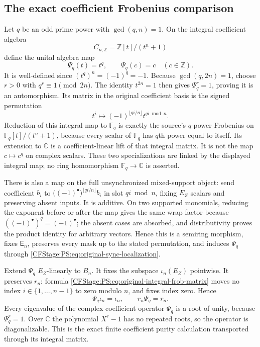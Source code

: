 \subsection{The exact coefficient Frobenius comparison}

Let $q$ be an odd prime power with $\gcd(q,n)=1$.
On the integral coefficient algebra
\[
 C_{n,\mathbb Z}=\mathbb Z[t]/(t^n+1)
\]
define the unital algebra map
\[
 \Psi_q(t)=t^q,\qquad \Psi_q(c)=c\quad(c\in\mathbb Z).
\]
It is well-defined since $(t^q)^n=(-1)^q=-1$.
Because $\gcd(q,2n)=1$, choose $r>0$ with $q^r\equiv1\pmod{2n}$.
The identity $t^{2n}=1$ then gives $\Psi_q^r=1$, proving it is an
automorphism. Its matrix in the original coefficient basis is the
signed permutation
\begin{equation}
 t^i\longmapsto(-1)^{\lfloor qi/n\rfloor}t^{qi\bmod n}.
 \label{CFStage:PS:eq:original-integral-frob-matrix}
\end{equation}
Reduction of this integral map to $\mathbb F_q$ is exactly the
source's $q$-power Frobenius on $\mathbb F_q[t]/(t^n+1)$, because
every scalar of $\mathbb F_q$ has $q$th power equal to itself.
Its extension to $\mathbb C$ is a coefficient-linear lift of that
integral matrix. It is not the map $c\mapsto c^q$ on complex scalars.
These two specializations are linked by the displayed integral map;
no ring homomorphism $\mathbb F_q\to\mathbb C$ is asserted.

There is also a map on the full unsynchronized mixed-support object:
send coefficient $b_i$ to
$\bigl((-1)^\bullet\bigr)^{\lfloor qi/n\rfloor}b_i$ in slot $qi\bmod n$,
fixing $E_Z$ scalars and preserving absent inputs. It is additive.
On two supported monomials, reducing the exponent before or after
the map gives the same wrap factor because $((-1)^\bullet)^q=(-1)^\bullet$;
the absent cases are absorbed, and distributivity proves the product
identity for arbitrary vectors. Hence this is a semiring morphism,
fixes $\mathsf E_n$, preserves every mask up to the stated permutation,
and induces $\Psi_q$ through \eqref{CFStage:PS:eq:original-sync-localization}.

Extend $\Psi_q$ $E_Z$-linearly to $B_n$. It fixes the subspace
$\iota_n(E_Z)$ pointwise. It preserves $r_n$: formula
\eqref{CFStage:PS:eq:original-integral-frob-matrix} moves no index
$i\in\{1,\ldots,n-1\}$ to zero modulo $n$, and fixes index zero.
Hence
\begin{equation}
 \Psi_q\iota_n=\iota_n,\qquad r_n\Psi_q=r_n.
 \label{CFStage:PS:eq:original-frob-retract}
\end{equation}
Every eigenvalue of the complex coefficient operator $\Psi_q$ is
a root of unity, because $\Psi_q^r=1$. Over $\mathbb C$ the
polynomial $X^r-1$ has no repeated roots, so the operator is
diagonalizable. This is the exact finite coefficient purity
calculation transported through its integral matrix.

